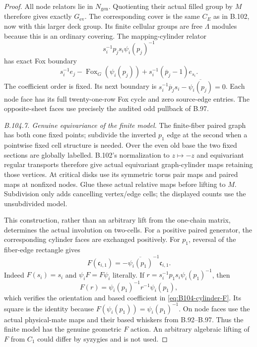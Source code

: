 \begin{proof}
All node relators lie in $N_{\mathrm{gen}}$. Quotienting their
actual filled group by $M$ therefore gives exactly $G_{\mathrm{ev}}$.
The corresponding cover is the same $C_E$ as in B.102, now with
this larger deck group. Its finite cellular groups are free
$\Lambda$ modules because this is an ordinary covering.
The mapping-cylinder relator
\[
       s_i^{-1}p_j s_i\psi_i(p_j)^{-1}
\]
has exact Fox boundary
\begin{equation}\label{eq:B104-cylinder-boundary}
 s_i^{-1}e_j-\operatorname{Fox}_G(\psi_i(p_j))
              +s_i^{-1}(\overline p_j-1)e_{s_i}.
\end{equation}
The coefficient order is fixed. Its next boundary is
$s_i^{-1}\overline p_j s_i-\overline{\psi_i(p_j)}=0$.
Each node face has its full twenty-one-row Fox cycle and zero
source-edge entries. The opposite-sheet faces use precisely the
audited odd pullback of B.97.

\emph{B.104.7. Genuine equivariance of the finite model.}
The finite-fiber paired graph has both cone fixed points; subdivide
the inverted $p_1$ edge at the second when a pointwise fixed
cell structure is needed. Over the even old base the two fixed
sections are globally labelled. B.102's normalization to
$z\mapsto-z$ and equivariant regular transports therefore give
actual equivariant graph-cylinder maps retaining those vertices.
At critical disks use its symmetric torus pair maps and paired
maps at nonfixed nodes. Glue these actual relative maps before
lifting to $M$. Subdivision only adds cancelling vertex/edge
cells; the displayed counts use the unsubdivided model.

This construction, rather than an arbitrary lift from the
one-chain matrix, determines the actual involution on two-cells.
For a positive paired generator, the corresponding cylinder
faces are exchanged positively. For $p_1$, reversal of the
fiber-edge rectangle gives
\begin{equation}\label{eq:B104-cylinder-F}
 F(\mathfrak c_{i,1})
       =-\overline{\psi_i(p_1)}^{-1}\mathfrak c_{i,1}.
\end{equation}
Indeed $F(s_i)=s_i$ and $\psi_iF=F\psi_i$ literally. If
$r=s_i^{-1}p_1s_i\psi_i(p_1)^{-1}$, then
\[
              F(r)=\psi_i(p_1)^{-1}r^{-1}\psi_i(p_1),
\]
which verifies the orientation and based coefficient in
\eqref{eq:B104-cylinder-F}. Its square is the identity because
$F(\psi_i(p_1))=\psi_i(p_1)^{-1}$. On node faces use the actual
physical-mate maps and their based whiskers from B.92--B.97.
Thus the finite model has the genuine geometric $F$ action.
An arbitrary algebraic lifting of $F$ from $C_1$ could differ by
syzygies and is not used.


\end{proof}
